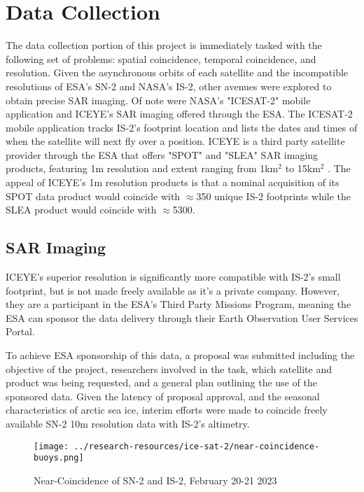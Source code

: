 \chapter{Data Collection}
\label{sec:Data_Collection}

The data collection portion of this project is immediately tasked with the following set of problems: spatial coincidence, temporal coincidence, and resolution. Given the asynchronous orbits of each satellite and the incompatible resolutions of ESA's SN-2 and NASA's IS-2, other avenues were explored to obtain precise SAR imaging. Of note were NASA's "ICESAT-2" mobile application and ICEYE's\textsuperscript{\tiny\textcopyright} SAR imaging offered through the ESA. The ICESAT-2 mobile application tracks IS-2's footprint location and lists the dates and times of when the satellite will next fly over a position. ICEYE is a third party satellite provider through the ESA that offers "SPOT" and "SLEA" SAR imaging products, featuring 1m resolution and extent ranging from 1km$^2$ to 15km$^2$ \cite{iceye-products}. The appeal of ICEYE's 1m resolution products is that a nominal acquisition of its SPOT data product would coincide with $\approx$350 unique IS-2 footprints while the SLEA product would coincide with $\approx$5300.

\section {SAR Imaging}
ICEYE's superior resolution is significantly more compatible with IS-2's small footprint, but is not made freely available as it's a private company. However, they are a participant in the ESA's Third Party Missions Program, meaning the ESA can sponsor the data delivery through their Earth Observation User Services Portal. 

To achieve ESA sponsorship of this data, a proposal was submitted including the objective of the project, researchers involved in the task, which satellite and product was being requested, and a general plan outlining the use of the sponsored data. Given the latency of proposal approval, and the seasonal characteristics of arctic sea ice, interim efforts were made to coincide freely available SN-2 10m resolution data with IS-2's altimetry.

\begin{figure}[h]
    \centering
	\texttt{[image: ../research-resources/ice-sat-2/near-coincidence-buoys.png]}
    \caption[Existing Coincident Data Unavailability]{Near-Coincidence of SN-2 and IS-2, February 20-21 2023}
    \label{fig:near-coincidence}
\end{figure}

